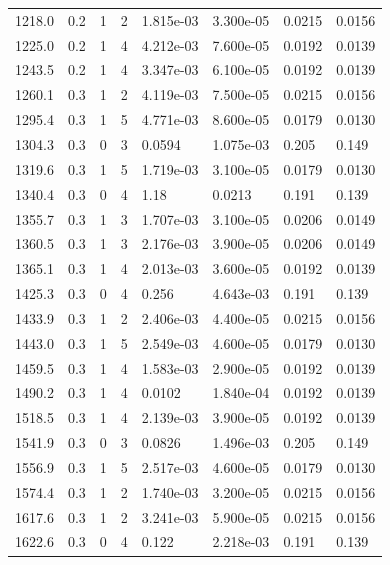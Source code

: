 \documentclass[preview]{standalone}
\begin{document}
{{{\begin{tabular}{L{1.2cm}C{1.2cm} C{0.3cm}C{0.5cm} C{1.4cm}C{1.4cm} C{1.4cm}C{1.4cm}}
  1218.0  &   0.2  & 1     &  2 &  1.815e-03  & 3.300e-05  & 0.0215 &  0.0156   \\ 
  1225.0  &   0.2  & 1     &  4 &  4.212e-03  & 7.600e-05  & 0.0192 &  0.0139   \\ 
  1243.5  &   0.2  & 1     &  4 &  3.347e-03  & 6.100e-05  & 0.0192 &  0.0139   \\ 
  1260.1  &   0.3  & 1     &  2 &  4.119e-03  & 7.500e-05  & 0.0215 &  0.0156   \\ 
  1295.4  &   0.3  & 1     &  5 &  4.771e-03  & 8.600e-05  & 0.0179 &  0.0130   \\ 
  1304.3  &   0.3  & 0     &  3 &  0.0594  & 1.075e-03  & 0.205 &  0.149   \\ 
  1319.6  &   0.3  & 1     &  5 &  1.719e-03  & 3.100e-05  & 0.0179 &  0.0130   \\ 
  1340.4  &   0.3  & 0     &  4 &  1.18  & 0.0213  & 0.191 &  0.139   \\ 
  1355.7  &   0.3  & 1     &  3 &  1.707e-03  & 3.100e-05  & 0.0206 &  0.0149   \\ 
  1360.5  &   0.3  & 1     &  3 &  2.176e-03  & 3.900e-05  & 0.0206 &  0.0149   \\ 
  1365.1  &   0.3  & 1     &  4 &  2.013e-03  & 3.600e-05  & 0.0192 &  0.0139   \\ 
  1425.3  &   0.3  & 0     &  4 &  0.256  & 4.643e-03  & 0.191 &  0.139   \\ 
  1433.9  &   0.3  & 1     &  2 &  2.406e-03  & 4.400e-05  & 0.0215 &  0.0156   \\ 
  1443.0  &   0.3  & 1     &  5 &  2.549e-03  & 4.600e-05  & 0.0179 &  0.0130   \\ 
  1459.5  &   0.3  & 1     &  4 &  1.583e-03  & 2.900e-05  & 0.0192 &  0.0139   \\ 
  1490.2  &   0.3  & 1     &  4 &  0.0102  & 1.840e-04  & 0.0192 &  0.0139   \\ 
  1518.5  &   0.3  & 1     &  4 &  2.139e-03  & 3.900e-05  & 0.0192 &  0.0139   \\ 
  1541.9  &   0.3  & 0     &  3 &  0.0826  & 1.496e-03  & 0.205 &  0.149   \\ 
  1556.9  &   0.3  & 1     &  5 &  2.517e-03  & 4.600e-05  & 0.0179 &  0.0130   \\ 
  1574.4  &   0.3  & 1     &  2 &  1.740e-03  & 3.200e-05  & 0.0215 &  0.0156   \\ 
  1617.6  &   0.3  & 1     &  2 &  3.241e-03  & 5.900e-05  & 0.0215 &  0.0156   \\ 
  1622.6  &   0.3  & 0     &  4 &  0.122  & 2.218e-03  & 0.191 &  0.139   \\ 

\end{tabular}}}}
\end{document}
